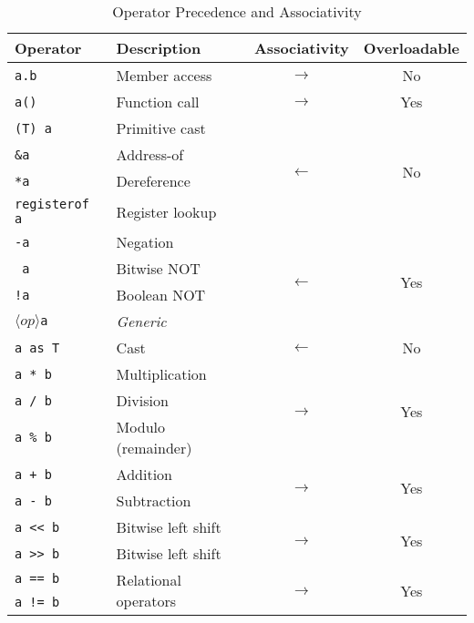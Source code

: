 \begin{table}[h]
    \centering
    \caption{Operator Precedence and Associativity}
    \begin{tabular}{|l|l|c|c|}
        \hline
        \textbf{Operator} & \textbf{Description} & \textbf{Associativity} & \textbf{Overloadable} \\
        \hline
        \texttt{a.b} & Member access & \(\longrightarrow\) & No \\
        \hline
        \texttt{a()} & Function call & \(\longrightarrow\) & Yes \\
        \hline
        \texttt{(T) a} & Primitive cast & \multirow{4}{*}{\(\longleftarrow\)} & \multirow{4}{*}{No} \\
        \texttt{\&a} & Address-of & & \\
        \texttt{*a} & Dereference & & \\
        \texttt{registerof a} & Register lookup & & \\
        \hline
        \texttt{-a} & Negation & \multirow{4}{*}{\(\longleftarrow\)} & \multirow{4}{*}{Yes} \\
        \texttt{~a} & Bitwise NOT & & \\
        \texttt{!a} & Boolean NOT & & \\
        \(\langle op \rangle\)\texttt{a} & \textit{Generic} & & \\
        \hline
        \texttt{a as T} & Cast & \(\longleftarrow\) & No \\
        \hline
        \texttt{a * b} & Multiplication & \multirow{3}{*}{\(\longrightarrow\)} & \multirow{3}{*}{Yes} \\
        \texttt{a / b} & Division & & \\
        \texttt{a \% b} & Modulo (remainder) & & \\
        \hline
        \texttt{a + b} & Addition & \multirow{2}{*}{\(\longrightarrow\)} & \multirow{2}{*}{Yes} \\
        \texttt{a - b} & Subtraction & & \\
        \hline
        \texttt{a << b} & Bitwise left shift & \multirow{2}{*}{\(\longrightarrow\)} & \multirow{2}{*}{Yes} \\
        \texttt{a >> b} & Bitwise left shift & & \\
        \hline
        \texttt{a == b} & \multirow{6}{*}{Relational operators} & \multirow{6}{*}{\(\longrightarrow\)} & \multirow{6}{*}{Yes} \\
        \texttt{a != b} & & & \\

\end{tabular}
\end{table}
